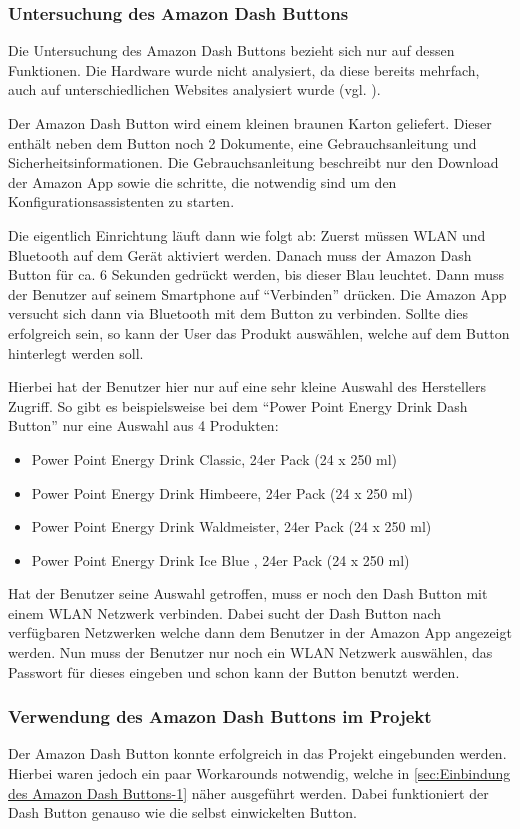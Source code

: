 \subsubsection{Untersuchung des Amazon Dash Buttons}
\label{sec:Untersuchung des Amazon Dash Buttons}
Die Untersuchung des Amazon Dash Buttons bezieht sich nur auf dessen Funktionen.
Die Hardware wurde nicht analysiert, da diese bereits mehrfach, auch auf unterschiedlichen Websites analysiert wurde (vgl. \cite{.17.05.2017}\cite{.17.05.2017b}).

Der Amazon Dash Button wird einem kleinen braunen Karton geliefert.
Dieser enthält neben dem Button noch 2 Dokumente, eine Gebrauchsanleitung und Sicherheitsinformationen.
Die Gebrauchsanleitung beschreibt nur den Download der Amazon App sowie die schritte, die notwendig sind um den Konfigurationsassistenten zu starten.

Die eigentlich Einrichtung läuft dann wie folgt ab:
Zuerst müssen \ac{WLAN} und Bluetooth auf dem Gerät aktiviert werden.
Danach muss der Amazon Dash Button für ca. 6 Sekunden gedrückt werden, bis dieser Blau leuchtet.
Dann muss der Benutzer auf seinem Smartphone auf "`Verbinden"' drücken.
Die Amazon App versucht sich dann via Bluetooth mit dem Button zu verbinden.
Sollte dies erfolgreich sein, so kann der User das  Produkt auswählen, welche auf dem Button hinterlegt werden soll.

Hierbei hat der Benutzer hier nur auf eine sehr kleine Auswahl des Herstellers Zugriff.
So gibt es beispielsweise bei dem "`Power Point Energy Drink Dash Button"' nur eine Auswahl aus 4 Produkten:
\begin{itemize}
\item Power Point Energy Drink Classic, 24er Pack (24 x 250 ml)
\item Power Point Energy Drink Himbeere, 24er Pack (24 x 250 ml)
\item Power Point Energy Drink Waldmeister, 24er Pack (24 x 250 ml)
\item Power Point Energy Drink Ice Blue , 24er Pack (24 x 250 ml) 
\end{itemize}
Hat der Benutzer seine Auswahl getroffen, muss er noch den Dash Button mit einem WLAN Netzwerk verbinden.
Dabei sucht der Dash Button nach verfügbaren Netzwerken welche dann dem Benutzer in der Amazon App angezeigt werden.
Nun muss der Benutzer nur noch ein \ac{WLAN} Netzwerk auswählen, das Passwort für dieses eingeben und schon kann der Button benutzt werden.

\subsubsection{Verwendung des Amazon Dash Buttons im Projekt}
\label{sec:Verwendung des Amazon Dash Buttons im Projekt}
Der Amazon Dash Button konnte erfolgreich in das Projekt eingebunden werden. Hierbei waren jedoch ein paar Workarounds notwendig, welche in \ref{sec:Einbindung des Amazon Dash Buttons-1} näher ausgeführt werden. Dabei funktioniert der Dash Button genauso wie die selbst einwickelten Button.